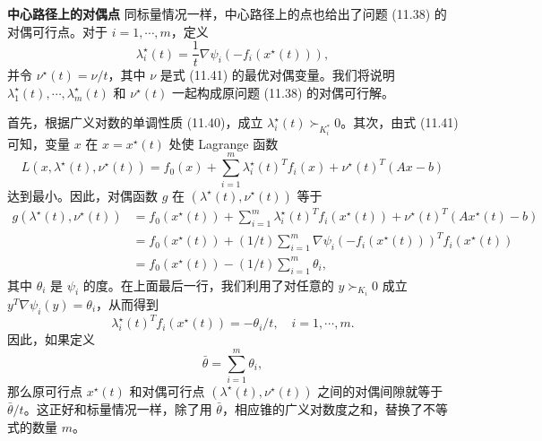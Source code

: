 \documentclass[UTF8, 12pt, fontset=fandol, oneside]{ctexart}
\begin{document}
\noindent\textbf{中心路径上的对偶点}\quad
同标量情况一样，中心路径上的点也给出了问题 (11.38) 的对偶可行点。对于 $i=1,\cdots,m$，定义
\begin{equation}
\lambda_i^\star(t)=\frac{1}{t}\nabla\psi_i(-f_i(x^\star(t))),
\tag{11.42}
\end{equation}
并令 $\nu^\star(t)=\nu/t$，其中 $\nu$ 是式 (11.41) 的最优对偶变量。我们将说明 $\lambda_1^\star(t),\cdots,\lambda_m^\star(t)$ 和 $\nu^\star(t)$ 一起构成原问题 (11.38) 的对偶可行解。

首先，根据广义对数的单调性质 (11.40)，成立 $\lambda_i^\star(t)\succ_{K_i^\ast}0$。其次，由式 (11.41) 可知，变量 $x$ 在 $x=x^\star(t)$ 处使 Lagrange 函数
\[
L(x,\lambda^\star(t),\nu^\star(t))=f_0(x)+\sum_{i=1}^m\lambda_i^\star(t)^Tf_i(x)+\nu^\star(t)^T(Ax-b)
\]
达到最小。因此，对偶函数 $g$ 在 $(\lambda^\star(t),\nu^\star(t))$ 等于
\[
\begin{aligned}
g(\lambda^\star(t),\nu^\star(t))
&=f_0(x^\star(t))+\sum_{i=1}^m\lambda_i^\star(t)^Tf_i(x^\star(t))+\nu^\star(t)^T(Ax^\star(t)-b)\\
&=f_0(x^\star(t))+(1/t)\sum_{i=1}^m\nabla\psi_i(-f_i(x^\star(t)))^Tf_i(x^\star(t))\\
&=f_0(x^\star(t))-(1/t)\sum_{i=1}^m\theta_i,
\end{aligned}
\]
其中 $\theta_i$ 是 $\psi_i$ 的度。在上面最后一行，我们利用了对任意的 $y\succ_{K_i}0$ 成立 $y^T\nabla\psi_i(y)=\theta_i$，从而得到
\begin{equation}
\lambda_i^\star(t)^Tf_i(x^\star(t))=-\theta_i/t,\quad i=1,\cdots,m.
\tag{11.43}
\end{equation}
因此，如果定义
\[
\bar{\theta}=\sum_{i=1}^m\theta_i,
\]
那么原可行点 $x^\star(t)$ 和对偶可行点 $(\lambda^\star(t),\nu^\star(t))$ 之间的对偶间隙就等于 $\bar{\theta}/t$。这正好和标量情况一样，除了用 $\bar{\theta}$，相应锥的广义对数度之和，替换了不等式的数量 $m$。
\end{document}
